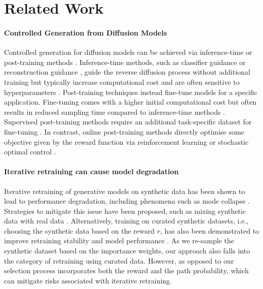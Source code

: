 \section{Related Work}
\paragraph{Controlled Generation from Diffusion Models}
Controlled generation for diffusion models can be achieved via inference-time or post-training methods \citep{uehara2025reward}. Inference-time methods, such as classifier guidance \citep{dhariwal2021diffusion} or reconstruction guidance \citep{chung2022diffusion}, guide the reverse diffusion process without additional training but typically increase computational cost and are often sensitive to hyperparameters \citep{song2023solving}. Post-training techniques instead fine-tune models for a specific application. Fine-tuning comes with a higher initial computational cost but often results in reduced sampling time compared to inference-time methods \citep{denker2024deft}. Supervised post-training methods require an additional task-specific dataset for fine-tuning \citep{ruiz2022dreambooth,zhang2023adding,xu2024imagereward}. In contrast, online post-training methods directly optimise some objective given by the reward function via reinforcement learning \citep{venkatraman2024amortizing,clark2023directly,fan2024reinforcement,black2024training} or stochastic optimal control \citep{denker2024deft,domingo2024adjoint}. 


\paragraph{Iterative retraining can cause model degradation} Iterative retraining of generative models on synthetic data has been shown to lead to performance degradation, including phenomena such as mode collapse \citep{alemohammad2023self,shumailov2023curse}. Strategies to mitigate this issue have been proposed, such as mixing synthetic data with real data \citep{bertrand2023stability}. Alternatively, training on curated synthetic datasets, i.e., choosing the synthetic data based on the reward $r$, has also been demonstrated to improve retraining stability and model performance \citep{ferbach2024self}. As we re-sample the synthetic dataset based on the importance weights, our approach also falls into the category of retraining using curated data. However, as opposed to \cite{ferbach2024self} our selection process incorporates both the reward and the path probability, which can mitigate risks associated with iterative retraining.
 
